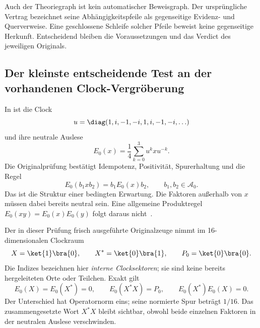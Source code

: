 Auch der Theoriegraph ist kein automatischer Beweisgraph. Der ursprüngliche Vertrag  bezeichnet seine Abhängigkeitspfeile als gegenseitige Evidenz- und Querverweise. Eine geschlossene Schleife solcher Pfeile beweist keine gegenseitige Herkunft. Entscheidend bleiben die Voraussetzungen und das Verdict des jeweiligen Originals.

\subsection*{Der kleinste entscheidende Test an der vorhandenen Clock-Vergröberung}
In  ist die Clock
\[
 u=\diag(1,i,-1,-i,1,i,-1,-i,\ldots)
\]
und ihre neutrale Auslese
\[
 E_0(x)=\frac14\sum_{k=0}^{3}u^k x u^{-k}.
\]
Die Originalprüfung bestätigt Idempotenz, Positivität, Spurerhaltung und die Regel
\[
 E_0(b_1xb_2)=b_1E_0(x)b_2,\qquad b_1,b_2\in\mathcal A_0.
\]
Das ist die Struktur einer bedingten Erwartung. Die Faktoren außerhalb von $x$ müssen dabei bereits neutral sein. Eine allgemeine Produktregel $E_0(xy)=E_0(x)E_0(y)$ folgt daraus nicht~\cite{tomiyamaexpectation}.

Der in dieser Prüfung frisch ausgeführte Originalzeuge nimmt im 16-dimensionalen Clockraum
\[
 X=\ket{1}\bra{0},\qquad X^*=\ket{0}\bra{1},\qquad P_0=\ket{0}\bra{0}.
\]
Die Indizes bezeichnen hier \emph{interne Clocksektoren}; sie sind keine bereits hergeleiteten Orte oder Teilchen. Exakt gilt
\[
 E_0(X)=E_0(X^*)=0,\qquad
 E_0(X^*X)=P_0,\qquad E_0(X^*)E_0(X)=0.
\]
Der Unterschied hat Operatornorm eins; seine normierte Spur beträgt $1/16$. Das zusammengesetzte Wort $X^*X$ bleibt sichtbar, obwohl beide einzelnen Faktoren in der neutralen Auslese verschwinden.

\begin{center}
\end{center}

